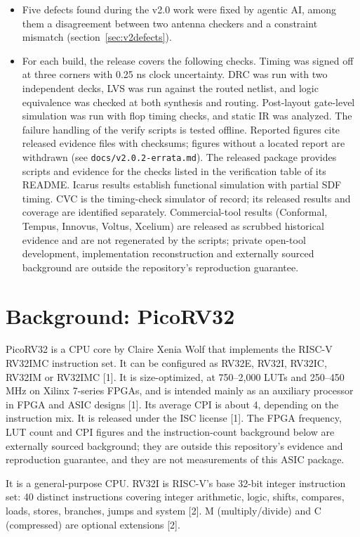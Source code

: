 \documentclass[11pt,letterpaper]{article}
\newcommand{\sk}[1]{\texttt{#1}}
\renewcommand{\_}{\textunderscore\penalty0\hskip0pt\relax}
\begin{document}
\begin{itemize}
\item Five defects found during the v2.0 work were fixed by agentic AI, among them a disagreement between two antenna checkers and a constraint mismatch (section~\ref{sec:v2defects}).
\item For each build, the release covers the following checks. Timing was signed off at three corners with 0.25 ns clock uncertainty. DRC was run with two independent decks, LVS was run against the routed netlist, and logic equivalence was checked at both synthesis and routing. Post-layout gate-level simulation was run with flop timing checks, and static IR was analyzed. The failure handling of the verify scripts is tested offline. Reported figures cite released evidence files with checksums; figures without a located report are withdrawn (see \sk{docs/v2.0.2-errata.md}). The released package provides scripts and evidence for the checks listed in the verification table of its README. Icarus results establish functional simulation with partial SDF timing. CVC is the timing-check simulator of record; its released results and coverage are identified separately. Commercial-tool results (Conformal, Tempus, Innovus, Voltus, Xcelium) are released as scrubbed historical evidence and are not regenerated by the scripts; private open-tool development, implementation reconstruction and externally sourced background are outside the repository's reproduction guarantee.
\end{itemize}

\section*{Background: PicoRV32}
PicoRV32 is a CPU core by Claire Xenia Wolf that implements the RISC-V RV32IMC instruction set. It can be configured as RV32E, RV32I, RV32IC, RV32IM or RV32IMC [1]. It is size-optimized, at 750--2,000 LUTs and 250--450 MHz on Xilinx 7-series FPGAs, and is intended mainly as an auxiliary processor in FPGA and ASIC designs [1]. Its average CPI is about 4, depending on the instruction mix. It is released under the ISC license [1]. The FPGA frequency, LUT count and CPI figures and the instruction-count background below are externally sourced background; they are outside this repository's evidence and reproduction guarantee, and they are not measurements of this ASIC package.

It is a general-purpose CPU. RV32I is RISC-V's base 32-bit integer instruction set: 40 distinct instructions covering integer arithmetic, logic, shifts, compares, loads, stores, branches, jumps and system [2]. M (multiply/divide) and C (compressed) are optional extensions [2].
\end{document}
